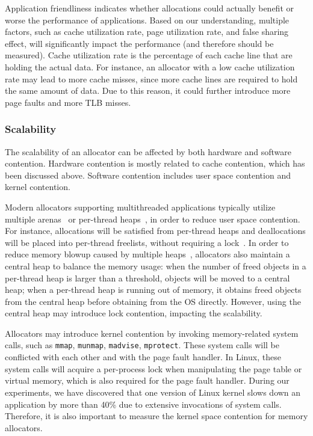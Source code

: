 Application friendliness indicates whether allocations could actually benefit or worse the performance of applications. Based on our understanding, multiple factors, such as cache utilization rate, page utilization rate, and false sharing effect, will significantly impact the performance (and therefore should be measured). Cache utilization rate is the percentage of each cache line that are holding the actual data. For instance, an allocator with a low cache utilization rate may lead to more cache misses, since more cache lines are required to hold the same amount of data. Due to this reason, it could further introduce more page faults and more TLB misses. 

\subsubsection{Scalability} 
\label{sec:scalability}

The scalability of an allocator can be affected by both hardware and software contention. Hardware contention is mostly related to cache contention, which has been discussed above. Software contention includes user space contention and kernel contention. 

Modern allocators supporting multithreaded applications typically utilize multiple arenas~\cite{dlmalloc} or per-thread heaps~\cite{Hoard}, in order to reduce user space contention. For instance, allocations will be satisfied from per-thread heaps and deallocations will be placed into per-thread freelists, without requiring a lock~\cite{TcMalloc, jemalloc}. In order to reduce memory blowup caused by multiple heaps~\cite{Hoard}, allocators also maintain a central heap to balance the memory usage: when the number of freed objects in a per-thread heap is larger than a threshold, objects will be moved to a central heap; when a per-thread heap is running out of memory, it obtains freed objects from the central heap before obtaining from the OS directly. However, using the central heap may introduce lock contention, impacting the scalability.  

 
 Allocators may introduce kernel contention by invoking memory-related system calls, such as \texttt{mmap}, \texttt{munmap}, \texttt{madvise}, \texttt{mprotect}. These system calls will be  conflicted with each other and with the page fault handler.  In Linux, these system calls will acquire a per-process lock when manipulating the page table or virtual memory, which is also required for the page fault handler. During our experiments, we have discovered that one version of Linux kernel slows down an application by more than 40\% due to extensive invocations of system calls. Therefore, it is also important to measure the kernel space contention for memory allocators.
 
